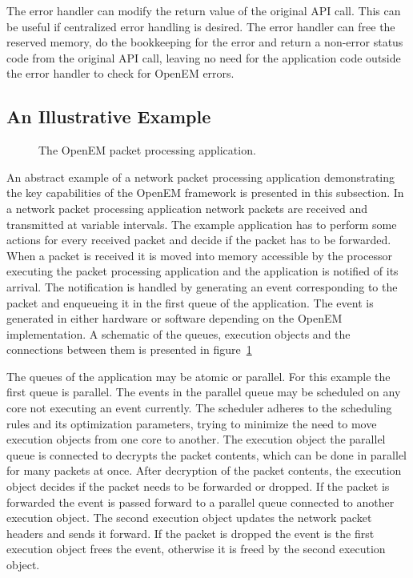 The error handler can modify the return value of the original API call. This can be useful if centralized error handling is desired. The error handler can free the reserved memory, do the bookkeeping for the error and return a non-error status code from the original API call, leaving no need for the application code outside the error handler to check for OpenEM errors.~\cite{openempage}

\subsection{An Illustrative Example}
\label{subsec:example}
\begin{figure}[h!]
    \begin{center}
        
        \caption{The OpenEM packet processing application.}
        \label{fig:openem-example-flow}
    \end{center}
\end{figure}
An abstract example of a network packet processing application demonstrating the key capabilities of the OpenEM framework is presented in this subsection. In a network packet processing application network packets are received and transmitted at variable intervals. The example application has to perform some actions for every received packet and decide if the packet has to be forwarded. When a packet is received it is moved into memory accessible by the processor executing the packet processing application and the application is notified of its arrival. The notification is handled by generating an event corresponding to the packet and enqueueing it in the first queue of the application. The event is generated in either hardware or software depending on the OpenEM implementation. A schematic of the queues, execution objects and the connections between them is presented in figure~\ref{fig:openem-example-flow}

The queues of the application may be atomic or parallel. For this example the first queue is parallel. The events in the parallel queue may be scheduled on any core not executing an event currently. The scheduler adheres to the scheduling rules and its optimization parameters, trying to minimize the need to move execution objects from one core to another. The execution object the parallel queue is connected to decrypts the packet contents, which can be done in parallel for many packets at once. After decryption of the packet contents, the execution object decides if the packet needs to be forwarded or dropped. If the packet is forwarded the event is passed forward to a parallel queue connected to another execution object. The second execution object updates the network packet headers and sends it forward. If the packet is dropped the event is the first execution object frees the event, otherwise it is freed by the second execution object.

